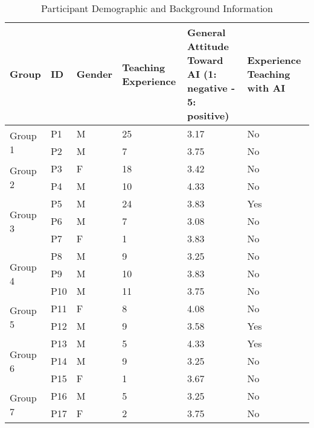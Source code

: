 \begin{table*}
  \centering
  \caption{Participant Demographic and Background Information}
  \label{tab:participant_info}
  \begin{tabular}{p{1.5cm} p{1cm} p{1.2cm} p{1.7cm} p{4.2cm} p{3cm}}
    \toprule
    \textbf{Group} & \textbf{ID} & \textbf{Gender} & \textbf{Teaching \newline Experience} & 
    \textbf{General Attitude Toward AI \newline(1: negative - 5: positive)} & 
    \textbf{Experience \newline Teaching with AI} \\
    \midrule
    \multirow{2}{*}{Group 1} 
      & P1  & M & 25 & 3.17 & No \\
      & P2  & M & 7  & 3.75 & No \\
    \midrule
    \multirow{2}{*}{Group 2} 
      & P3  & F & 18 & 3.42 & No \\
      & P4  & M & 10 & 4.33 & No \\
    \midrule
    \multirow{3}{*}{Group 3} 
      & P5  & M & 24 & 3.83 & Yes \\
      & P6  & M & 7  & 3.08 & No \\
      & P7  & F & 1  & 3.83 & No \\
    \midrule
    \multirow{3}{*}{Group 4} 
      & P8  & M & 9  & 3.25 & No \\
      & P9  & M & 10 & 3.83 & No \\
      & P10 & M & 11 & 3.75 & No \\
    \midrule
    \multirow{2}{*}{Group 5}
      & P11 & F & 8  & 4.08 & No \\
      & P12 & M & 9  & 3.58 & Yes \\
    \midrule
    \multirow{3}{*}{Group 6} 
      & P13 & M & 5  & 4.33 & Yes \\
      & P14 & M & 9  & 3.25 & No \\
      & P15 & F & 1  & 3.67 & No \\
    \midrule
    \multirow{2}{*}{Group 7} 
      & P16 & M & 5  & 3.25 & No \\
      & P17 & F & 2  & 3.75 & No \\
    \bottomrule
  \end{tabular}
\end{table*}